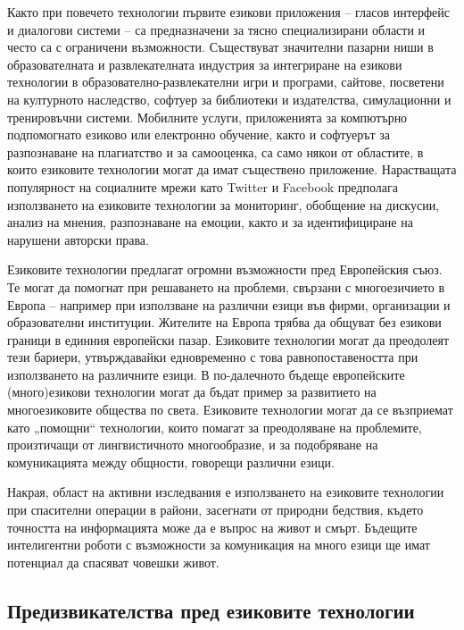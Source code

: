 \documentclass[]{../../metanetpaper}
\begin{document}
\begin{multicols}{2}

Както при повечето технологии първите езикови приложения -- гласов
 интерфейс и диалогови системи -- са предназначени за тясно специализирани области и често са с ограничени възможности. 
 Съществуват значителни пазарни ниши в образователната и развлекателната индустрия за интегриране на  езикови технологии в образователно-развлекателни  игри и програми, сайтове, посветени на културното наследство, софтуер за библиотеки и издателства, симулационни и тренировъчни системи. 
Мобилните услуги, приложенията за компютърно подпомогнато езиково или електронно обучение, както и софтуерът за разпознаване
 на плагиатство и за самооценка, са само някои от областите, в които езиковите технологии могат да имат съществено приложение. Нарастващата популярност на социалните мрежи като Twitter и Facebook предполага използването на езиковите технологии за мониторинг, обобщение на дискусии, анализ на мнения, разпознаване на емоции, както и за идентифициране на нарушени авторски права.

Езиковите технологии предлагат огромни възможности пред Европейския
 съюз. Те могат да помогнат при решаването на проблеми, свързани с многоезичието в Европа – например при използване на различни езици във фирми, организации и образователни институции. Жителите на Европа трябва  да общуват без езикови граници в единния европейски пазар.  Езиковите технологии могат да преодолеят тези бариери, утвърждавайки едновременно с това равнопоставеността при използването на различните езици. 
В по-далечното бъдеще европейските (много)езикови технологии могат да бъдат пример за развитието на многоезиковите общества по света.
 Езиковите технологии могат да се възприемат като „помощни“ технологии, които помагат за преодоляване на проблемите, произтичащи от лингвистичното многообразие, и за подобряване на комуникацията между общности, говорещи различни езици.

Накрая, област на активни изследвания е използването на езиковите технологии при спасителни операции в райони, засегнати от природни бедствия, където
 точността на информацията може да е въпрос на живот и смърт. Бъдещите интелигентни роботи с възможности за комуникация на много езици ще имат потенциал да спасяват човешки живот.

\subsection{Предизвикателства пред езиковите технологии}


\end{multicols}
\end{document}
